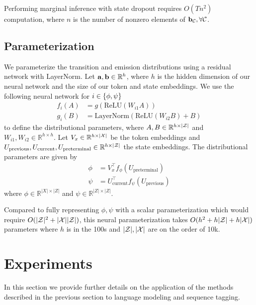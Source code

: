 \documentclass[11pt,a4paper]{article}
\begin{document}
Performing marginal inference with state dropout requires $O(Tn^2)$ computation,
where $n$ is the number of nonzero elements of $\mathbf{b}_{\mathcal{C}}, \forall \mathcal{C}$.

\subsection{Parameterization}
We parameterize the transition and emission distributions using a residual network
with LayerNorm.
Let $\mathbf{a},\mathbf{b}\in\mathbb{R}^h$, where $h$ is the hidden dimension of our neural network
and the size of our token and state embeddings.
We use the following neural network for $i \in \left\{\phi,\psi\right\}$
\begin{equation}
\begin{aligned}
f_i(A) &= g(\textrm{ReLU}(W_{i1}A))\\
g_i(B) &= \textrm{LayerNorm}(\textrm{ReLU}(W_{i2}B) + B)
\end{aligned}
\end{equation}
to define the distributional parameters,
where $A,B\in\mathbb{R}^{h \times |\mathcal{Z}|}$ and $W_{i1},W_{i2} \in \mathbb{R}^{h \times h}$.
Let $V_x \in \mathbb{R}^{h \times |\mathcal{X}|}$ be the token embeddings
and $U_{\textrm{previous}},U_{\textrm{current}},U_\textrm{preterminal}
\in \mathbb{R}^{h \times |\mathcal{Z}|}$ the state embeddings.
The distributional parameters are given by
\begin{equation}
\begin{aligned}
\phi &= V_x^\top f_\phi(U_\textrm{preterminal})\\
\psi &= U_\textrm{current}^\top f_\psi(U_\textrm{previous})
\end{aligned}
\end{equation}
where $\phi \in \mathbb{R}^{|X|\times|Z|}$ and $\psi \in \mathbb{R}^{|Z|\times|Z|}$.

Compared to fully representing $\phi,\psi$ with a scalar parameterization
which would require $O(|\mathcal{Z}|^2 + |\mathcal{X}||\mathcal{Z}|)$,
this neural parameterization takes $O(h^2 + h|\mathcal{Z}| + h|\mathcal{X}|)$ parameters
where $h$ is in the 100s and $|\mathcal{Z}|,|\mathcal{X}|$ are on the order of 10k.

\section{Experiments}
In this section we provide further details on the application
of the methods described in the previous section
to language modeling and sequence tagging.
\end{document}
